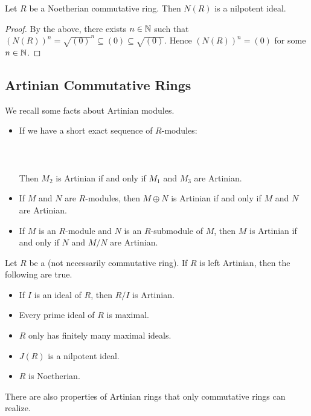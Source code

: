 \documentclass[a4paper]{article}
\begin{document}
\begin{prp}{}{} Let $R$ be a Noetherian commutative ring. Then $N(R)$ is a nilpotent ideal. \tcbline
\begin{proof}
By the above, there exists $n\in\mathbb{N}$ such that $(N(R))^n=\sqrt{(0)}^n\subseteq (0)\subseteq\sqrt{(0)}$. Hence $(N(R))^n=(0)$ for some $n\in\mathbb{N}$. 
\end{proof}
\end{prp}

\subsection{Artinian Commutative Rings}
We recall some facts about Artinian modules. 

\begin{itemize}
\item If we have a short exact sequence of $R$-modules: \\~\\
\\~\\
Then $M_2$ is Artinian if and only if $M_1$ and $M_3$ are Artinian. 
\item If $M$ and $N$ are $R$-modules, then $M\oplus N$ is Artinian if and only if $M$ and $N$ are Artinian. 
\item If $M$ is an $R$-module and $N$ is an $R$-submodule of $M$, then $M$ is Artinian if and only if $N$ and $M/N$ are Artinian.
\end{itemize}

Let $R$ be a (not necessarily commutative ring). If $R$ is left Artinian, then the following are true. 

\begin{itemize}
\item If $I$ is an ideal of $R$, then $R/I$ is Artinian. 
\item Every prime ideal of $R$ is maximal. 
\item $R$ only has finitely many maximal ideals. 
\item $J(R)$ is a nilpotent ideal. 
\item $R$ is Noetherian. 
\end{itemize}

There are also properties of Artinian rings that only commutative rings can realize. 
\end{document}

